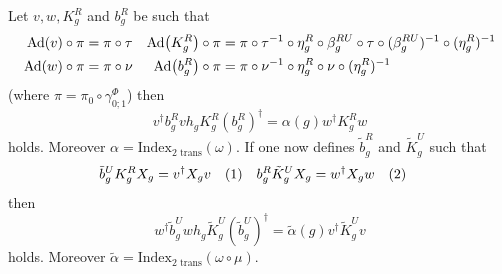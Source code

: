 \documentclass[11pt,a4paper,twoside]{article}
\numberwithin{equation}{section}
\begin{document}
	\begin{lemma}
		Let $v,w,K_g^R$ and $b_g^R$ be such that
		\begin{align}
			\Ad{v}\circ\pi&=\pi\circ\tau&\Ad{K_g^R}\circ\pi&=\pi\circ\tau^{-1}\circ\eta_g^R\circ\beta_g^{RU}\circ\tau\circ(\beta_g^{RU})^{-1}\circ(\eta_g^R)^{-1}\\
			\Ad{w}\circ\pi&=\pi\circ\nu&\Ad{b_g^R}\circ\pi&=\pi\circ\nu^{-1}\circ\eta_g^R\circ\nu\circ(\eta_g^R)^{-1}
		\end{align}
		(where $\pi=\pi_0\circ\gamma^\Phi_{0;1}$) then
		\begin{equation}\label{eq:H^1IndexRotationInvariantHorizontalIndex}
			v^\dagger b_g^R vh_g K_g^R (b_g^R)^\dagger=\alpha(g)w^\dagger K_g^R w
		\end{equation}
		holds. Moreover $\alpha=\textrm{Index}_{\text{2 trans}}(\omega)$. If one now defines $\tilde{b}_g^R$ and $\tilde{K}_g^U$ such that
		\begin{align*}
			\tilde{b}_g^UK_g^R X_g&=v^\dagger X_g v\Label{eq:H^1IndexRotationInvariantFirstDefinition}&b_g^R\tilde{K}_g^UX_g&=w^\dagger X_g w\Label{eq:H^1IndexRotationInvariantSecondDefinition}
		\end{align*}
		then
		\begin{equation}\label{eq:H^1IndexRotationInvariantVerticalIndex}
			w^\dagger \tilde b_g^U wh_g \tilde K_g^U (\tilde b_g^U)^\dagger=\tilde\alpha(g)v^\dagger \tilde K_g^U v
		\end{equation}
		holds. Moreover $\tilde\alpha=\textrm{Index}_{\text{2 trans}}(\omega\circ\mu)$.
	\end{lemma}
\end{document}
